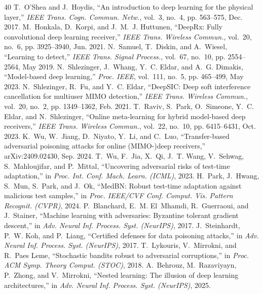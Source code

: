 \documentclass[journal]{IEEEtran}
\begin{document}
\scriptsize\begin{thebibliography}{40}
 T.~O'Shea and J.~Hoydis, ``An introduction to deep learning for the physical layer,'' \emph{IEEE Trans. Cogn. Commun. Netw.}, vol.~3, no.~4, pp. 563--575, Dec. 2017.
 M.~Honkala, D.~Korpi, and J.~M.~J. Huttunen, ``DeepRx: Fully convolutional deep learning receiver,'' \emph{IEEE Trans. Wireless Commun.}, vol.~20, no.~6, pp. 3925--3940, Jun. 2021.
 N.~Samuel, T.~Diskin, and A.~Wiesel, ``Learning to detect,'' \emph{IEEE Trans. Signal Process.}, vol.~67, no.~10, pp. 2554--2564, May 2019.
 N.~Shlezinger, J.~Whang, Y.~C. Eldar, and A.~G. Dimakis, ``Model-based deep learning,'' \emph{Proc. IEEE}, vol.~111, no.~5, pp. 465--499, May 2023.
 N.~Shlezinger, R.~Fu, and Y.~C. Eldar, ``DeepSIC: Deep soft interference cancellation for multiuser MIMO detection,'' \emph{IEEE Trans. Wireless Commun.}, vol.~20, no.~2, pp. 1349--1362, Feb. 2021.
 T.~Raviv, S.~Park, O.~Simeone, Y.~C. Eldar, and N.~Shlezinger, ``Online meta-learning for hybrid model-based deep receivers,'' \emph{IEEE Trans. Wireless Commun.}, vol.~22, no.~10, pp. 6415--6431, Oct. 2023.
 K.~Wu, W.~Jiang, D.~Niyato, Y.~Li, and C.~Luo, ``Transfer-based adversarial poisoning attacks for online (MIMO-)deep receivers,'' arXiv:2409.02430, Sep. 2024.
 T.~Wu, F.~Jia, X.~Qi, J.~T. Wang, V.~Sehwag, S.~Mahloujifar, and P.~Mittal, ``Uncovering adversarial risks of test-time adaptation,'' in \emph{Proc. Int. Conf. Mach. Learn. (ICML)}, 2023.
 H.~Park, J.~Hwang, S.~Mun, S.~Park, and J.~Ok, ``MedBN: Robust test-time adaptation against malicious test samples,'' in \emph{Proc. IEEE/CVF Conf. Comput. Vis. Pattern Recognit. (CVPR)}, 2024.
 P.~Blanchard, E.~M. El~Mhamdi, R.~Guerraoui, and J.~Stainer, ``Machine learning with adversaries: Byzantine tolerant gradient descent,'' in \emph{Adv. Neural Inf. Process. Syst. (NeurIPS)}, 2017.
 J.~Steinhardt, P.~W. Koh, and P.~Liang, ``Certified defenses for data poisoning attacks,'' in \emph{Adv. Neural Inf. Process. Syst. (NeurIPS)}, 2017.
 T.~Lykouris, V.~Mirrokni, and R.~Paes Leme, ``Stochastic bandits robust to adversarial corruptions,'' in \emph{Proc. ACM Symp. Theory Comput. (STOC)}, 2018.
 A.~Behrouz, M.~Razaviyayn, P.~Zhong, and V.~Mirrokni, ``Nested learning: The illusion of deep learning architectures,'' in \emph{Adv. Neural Inf. Process. Syst. (NeurIPS)}, 2025.

\end{thebibliography}
\end{document}

